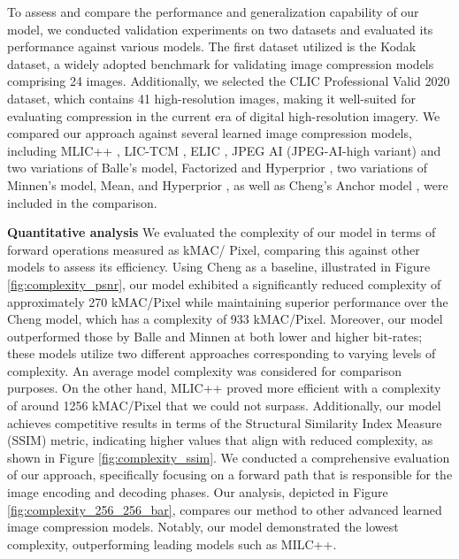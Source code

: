 \documentclass{article}
\begin{document}
To assess and compare the performance and generalization capability of our model, we conducted validation experiments on two datasets and evaluated its performance against various models. The first dataset utilized is the Kodak dataset, a widely adopted benchmark for validating image compression models comprising 24 images. Additionally, we selected the CLIC Professional Valid 2020 dataset, which contains 41 high-resolution images, making it well-suited for evaluating compression in the current era of digital high-resolution imagery. We compared our approach against several learned image compression models, including MLIC++ \cite{jiangMLICLinearComplexity2024}, LIC-TCM \cite{liuLearnedImageCompression2023}, ELIC \cite{heELICEfficientLearned2022}, JPEG AI \cite{JPEGAI2025} (JPEG-AI-high variant) and two variations of Balle's model, Factorized and Hyperprior \cite{balleVariationalImageCompression2018}, two variations of Minnen's model, Mean, and Hyperprior \cite{minnenJointAutoregressiveHierarchical2018}, as well as Cheng's Anchor model \cite{chengLearnedImageCompression2020}, were included in the comparison. 

\noindent\textbf{Quantitative analysis}
We evaluated the complexity of our model in terms of forward operations measured as kMAC/
Pixel, comparing this against other models to assess its efficiency. Using Cheng \cite{chengLearnedImageCompression2020} as a baseline, illustrated in Figure \ref{fig:complexity_psnr}, our model exhibited a significantly reduced complexity of approximately 270 kMAC/Pixel while maintaining superior performance over the Cheng model, which has a complexity of 933 kMAC/Pixel. Moreover, our model outperformed those by Balle and Minnen at both lower and higher bit-rates; these models utilize two different approaches corresponding to varying levels of complexity. An average model complexity was considered for comparison purposes. On the other hand, MLIC++ proved more efficient with a complexity of around 1256 kMAC/Pixel that we could not surpass. Additionally, our model achieves competitive results in terms of the Structural Similarity Index Measure (SSIM) metric, indicating higher values that align with reduced complexity, as shown in Figure \ref{fig:complexity_ssim}. We conducted a comprehensive evaluation of our approach, specifically focusing on a forward path that is responsible for the image encoding and decoding phases. Our analysis, depicted in Figure \ref{fig:complexity_256_256_bar}, compares our method to other advanced learned image compression models. Notably, our model demonstrated the lowest complexity, outperforming leading models such as MILC++.
\end{document}

